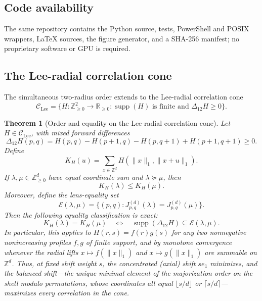 \documentclass[pdflatex,sn-mathphys-num]{sn-jnl}
\theoremstyle{thmstyleone}
\newtheorem{theorem}{Theorem}[section]
\theoremstyle{thmstylethree}
\theoremstyle{thmstyletwo}
\newcommand{\Z}{\mathbb Z}
\newcommand{\R}{\mathbb R}
\newcommand{\supp}{\operatorname{supp}}
\begin{document}
\subsection*{Code availability}
The same repository contains the Python source, tests, PowerShell and POSIX
wrappers, LaTeX sources, the figure generator, and a SHA-256 manifest; no
proprietary software or GPU is required.

\begin{appendices}
\renewcommand{\thetable}{\thesection.\arabic{table}}
\renewcommand{\theHtable}{appendix.\thesection.\arabic{table}}

\section{The Lee-radial correlation cone}
\label{app:radial}

The simultaneous two-radius order extends to the Lee-radial correlation
cone
\[
 \mathcal C_{\mathrm{Lee}}
 =\{H:\Z_{\ge0}^2\to\R_{\ge0}:\supp(H)\text{ is finite and }
       \Delta_{12}H\ge0\}.
\]

\begin{theorem}[Order and equality on the Lee-radial correlation cone]
\label{thm:radial-majorization}
Let $H\in\mathcal C_{\mathrm{Lee}}$, with mixed forward differences
\[
 \Delta_{12}H(p,q)=H(p,q)-H(p+1,q)-H(p,q+1)+H(p+1,q+1)\ge0.
\]
Define
\[
 K_H(u)=\sum_{x\in\Z^d}H(\|x\|_1,\|x+u\|_1).
\]
If $\lambda,\mu\in\Z_{\ge0}^d$ have equal coordinate sum and
$\lambda\succeq\mu$, then
\begin{equation}
 K_H(\lambda)\le K_H(\mu).                         \label{eq:radial-schur}
\end{equation}
Moreover, define the lens-equality set
\[
 \mathcal E(\lambda,\mu)=\{(p,q):J_{p,q}^{(d)}(\lambda)=J_{p,q}^{(d)}(\mu)\}.
\]
Then the following equality classification is exact:
\begin{equation}
 K_H(\lambda)=K_H(\mu)
 \quad\Longleftrightarrow\quad
 \supp(\Delta_{12}H)\subseteq\mathcal E(\lambda,\mu). \label{eq:radial-equality}
\end{equation}
In particular, this applies to
$H(r,s)=f(r)g(s)$ for any two nonnegative nonincreasing profiles $f,g$ of
finite support, and by monotone convergence whenever the radial lifts
$x\mapsto f(\|x\|_1)$ and $x\mapsto g(\|x\|_1)$ are summable on $\Z^d$.
Thus, at fixed shift weight $s$, the concentrated (axial) shift $se_1$
minimizes, and the balanced shift---the unique minimal element of the
majorization order on the shell modulo permutations, whose coordinates all
equal $\lfloor s/d\rfloor$ or $\lceil s/d\rceil$---maximizes every
correlation in the cone.


\end{theorem}
\end{appendices}
\end{document}
